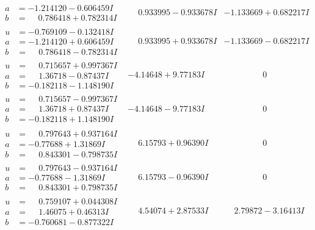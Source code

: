 \documentclass[1p]{elsarticle_modified}
\theoremstyle{definition}
\begin{document}
$$\begin{array}{c|c|c}
\begin{aligned}
a &= -1.214120 - 0.606459 I \\
b &= \phantom{-}0.786418 + 0.782314 I\end{aligned}
 & \phantom{-}0.933995 - 0.933678 I & -1.133669 + 0.682217 I \\ \hline\begin{aligned}
u &= -0.769109 - 0.132418 I \\
a &= -1.214120 + 0.606459 I \\
b &= \phantom{-}0.786418 - 0.782314 I\end{aligned}
 & \phantom{-}0.933995 + 0.933678 I & -1.133669 - 0.682217 I \\ \hline\begin{aligned}
u &= \phantom{-}0.715657 + 0.997367 I \\
a &= \phantom{-}1.36718 - 0.87437 I \\
b &= -0.182118 - 1.148190 I\end{aligned}
 & -4.14648 + 9.77183 I & \phantom{-0.000000 } 0 \\ \hline\begin{aligned}
u &= \phantom{-}0.715657 - 0.997367 I \\
a &= \phantom{-}1.36718 + 0.87437 I \\
b &= -0.182118 + 1.148190 I\end{aligned}
 & -4.14648 - 9.77183 I & \phantom{-0.000000 } 0 \\ \hline\begin{aligned}
u &= \phantom{-}0.797643 + 0.937164 I \\
a &= -0.77688 + 1.31869 I \\
b &= \phantom{-}0.843301 - 0.798735 I\end{aligned}
 & \phantom{-}6.15793 + 0.96390 I & \phantom{-0.000000 } 0 \\ \hline\begin{aligned}
u &= \phantom{-}0.797643 - 0.937164 I \\
a &= -0.77688 - 1.31869 I \\
b &= \phantom{-}0.843301 + 0.798735 I\end{aligned}
 & \phantom{-}6.15793 - 0.96390 I & \phantom{-0.000000 } 0 \\ \hline\begin{aligned}
u &= \phantom{-}0.759107 + 0.044308 I \\
a &= \phantom{-}1.46075 + 0.46313 I \\
b &= -0.760681 - 0.877322 I\end{aligned}
 & \phantom{-}4.54074 + 2.87533 I & \phantom{-}2.79872 - 3.16413 I \\ \hline\begin{aligned}

\end{aligned}
\end{array}$$
\end{document}
